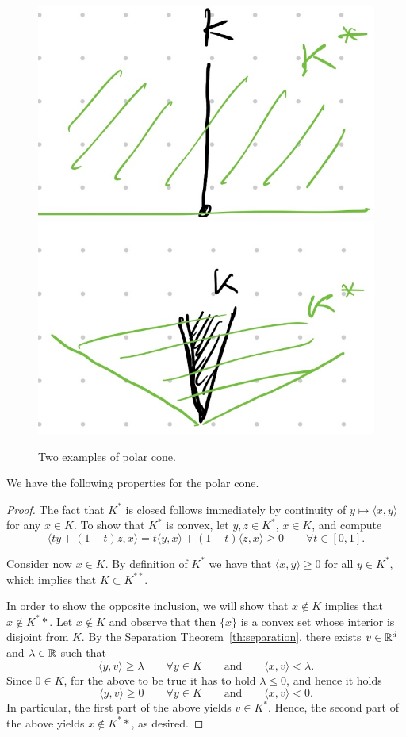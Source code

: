 \documentclass{report}
\begin{document}
	\begin{figure}[t]
		\centering
		\includegraphics[width=.3\textwidth]{images/polar-cone-1}
		\hspace{.1\textwidth}
		\includegraphics[width=.3\textwidth]{images/polar-cone-2}
		\caption{Two examples of polar cone.}
	\end{figure}

	We 	have the following properties for the polar cone.


	\begin{proof}
		The fact that $K^*$ is closed follows immediately by continuity of $y\mapsto \langle x,y\rangle$ for any $x\in K$. 
		To show that $K^*$ is convex, let $y,z\in K^*$, $x\in K$, and compute 
		\begin{equation}
			\langle ty + (1-t)z, x\rangle = t \langle y, x\rangle +(1-t) \langle z,x\rangle \ge 0 \qquad \forall t\in [0,1].
		\end{equation}

		Consider now $x\in K$. By definition of $K^*$ we have that $\langle x,y\rangle\ge 0$ for all $y\in K^*$, which implies that $K\subset K^{**}$. 
		
		In order to show the opposite inclusion, we will show that $x\notin K$ implies that $x\notin K^**$. Let $x\notin K$ and observe that then $\{x\}$ is a convex set whose interior is disjoint from $K$. By the Separation Theorem~\ref{th:separation}, there exists $v\in \mathbb{R}^d$ and $\lambda\in\mathbb{R}$ such that 
		\begin{equation}
			\langle y,v \rangle\ge  \lambda\qquad \forall y\in K
			\qquad\text{and}\qquad 
			\langle x,v \rangle < \lambda.
		\end{equation}
		Since $0\in K$, for the above to be true it has to hold $\lambda \le 0$, and hence it holds
		\begin{equation}
			\langle y,v \rangle\ge  0\qquad \forall y\in K
			\qquad\text{and}\qquad 
			\langle x,v \rangle < 0.
		\end{equation} 
		In particular, the first part of the above yields $v\in K^*$. Hence, the second part of the above yields $x\notin K^**$, as desired.
	\end{proof}
\end{document}
